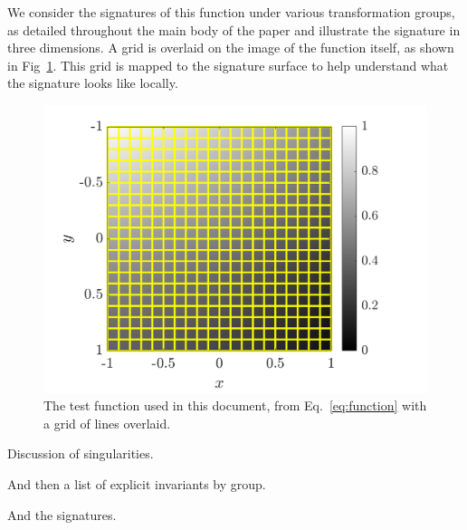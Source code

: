 \documentclass[review,onefignum,onetabnum]{siamonline190516}
\begin{document}
{We consider the signatures of this function under various transformation
groups, as detailed throughout the main body of the paper and illustrate
the signature in three dimensions. A grid is overlaid on the image of the
function itself, as shown in Fig~\ref{fig:function_scanlines}. This grid is
mapped to the signature surface to help understand what the signature looks
like locally.
\begin{figure}
  \centering
  \includegraphics[width=12cm]{Figs/function_scanlines}
  \caption{The test function used in this document, from
  Eq.~\eqref{eq:function} with a grid of lines
overlaid.}\label{fig:function_scanlines}
\end{figure}













Discussion of singularities. 

And then a list of explicit invariants by group.

And the signatures.

}
\end{document}
